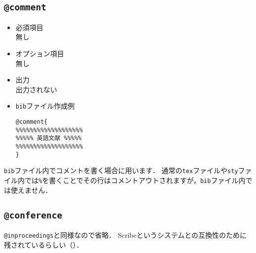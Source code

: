 \documentclass[a4paper,fleqn,uplatex,dvipdfmx]{jsarticle}
\makeatletter
\newcommand{\ttcomment}{\texttt{@comment}}
\newcommand{\ttconference}{\texttt{@conference}}
\newcommand{\ttinproceedings}{\texttt{@inproceedings}}
\makeatother
\begin{document}
\subsection{\ttcomment}
\label{ssec:comment}
\begin{screen}
    \begin{itemize}
        \item 必須項目 \\
        無し
        \item オプション項目 \\
        無し
        \item 出力 \\
        出力されない
        \item \verb|bib|ファイル作成例 \vspace{-3mm}
\begin{verbatim}
@comment{
%%%%%%%%%%%%%%%%%%%
%%%%% 英語文献 %%%%%
%%%%%%%%%%%%%%%%%%%
}
\end{verbatim}
    \end{itemize}
\end{screen}

\verb|bib|ファイル内でコメントを書く場合に用います．
通常の\verb|tex|ファイルや\verb|sty|ファイル内では\verb|%|を書くことでその行はコメントアウトされますが，\verb|bib|ファイル内では使えません．


\subsection{\ttconference}
\label{ssec:conference}
\ttinproceedings と同様なので省略．
Scribeというシステムとの互換性のために残されているらしい（\citealp{奥村:技評2020}）．
\end{document}
